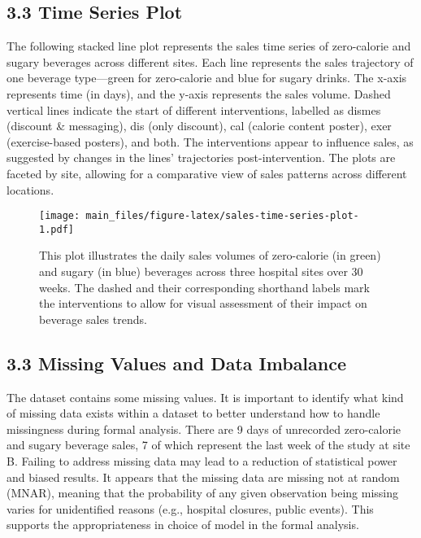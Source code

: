 \documentclass[
]{article}
\begin{document}
\hypertarget{time-series-plot}{%
\subsection{3.3 Time Series Plot}\label{time-series-plot}}

The following stacked line plot represents the sales time series of zero-calorie and sugary beverages across different sites. Each line represents the sales trajectory of one beverage type---green for zero-calorie and blue for sugary drinks. The x-axis represents time (in days), and the y-axis represents the sales volume. Dashed vertical lines indicate the start of different interventions, labelled as dismes (discount \& messaging), dis (only discount), cal (calorie content poster), exer (exercise-based posters), and both. The interventions appear to influence sales, as suggested by changes in the lines' trajectories post-intervention. The plots are faceted by site, allowing for a comparative view of sales patterns across different locations.

\begin{figure}
\centering
\texttt{[image: main\_files/figure-latex/sales-time-series-plot-1.pdf]}
\caption{\label{fig:sales-time-series-plot}This plot illustrates the daily sales volumes of zero-calorie (in green) and sugary (in blue) beverages across three hospital sites over 30 weeks. The dashed and their corresponding shorthand labels mark the interventions to allow for visual assessment of their impact on beverage sales trends.}
\end{figure}

\hypertarget{missing-values-and-data-imbalance}{%
\subsection{3.3 Missing Values and Data Imbalance}\label{missing-values-and-data-imbalance}}

The dataset contains some missing values. It is important to identify what kind of missing data exists within a dataset to better understand how to handle missingness during formal analysis. There are 9 days of unrecorded zero-calorie and sugary beverage sales, 7 of which represent the last week of the study at site B. Failing to address missing data may lead to a reduction of statistical power and biased results. It appears that the missing data are missing not at random (MNAR), meaning that the probability of any given observation being missing varies for unidentified reasons (e.g., hospital closures, public events). This supports the appropriateness in choice of model in the formal analysis.
\end{document}
